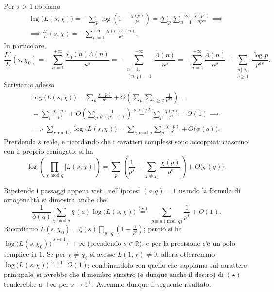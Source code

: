 \begin{oss} \label{logL}
  Per $\sigma>1$ abbiamo
  \begin{gather*}
    \log\big(L(s,\chi)\big)=-\sum_p \log\left(1-\frac{\chi(p)}{p^s}\right)=\sum_p\sum_{n=1}^{+\infty} \frac{\chi(p^n)}{np^{ns}} \implies \\
    \implies \frac{L'}{L}(s,\chi)=-\sum_{n=1}^{+\infty} \frac{\chi(n)\Lambda(n)}{n^s}.
  \end{gather*}
  In particolare,
  $$\frac{L'}{L}(s,\chi_0)=-\sum_{n=1}^{+\infty} \frac{\chi_0(n)\Lambda(n)}{n^s}=-\sum_{\substack{n=1, \\ (n,q)=1}}^{+\infty} \frac{\Lambda(n)}{n^s}=-\sum_{n=1}^{+\infty} \frac{\Lambda(n)}{n^s}+\sum_{\substack{p \mid q, \\a \ge 1}} \frac{\log{p}}{p^{as}}.$$
  Scriviamo adesso
  \begin{gather*}
    \log\big(L(s,\chi)\big)=\sum_p \frac{\chi(p)}{p^s}+O\left(\sum_p \sum_{n \ge 2} \frac{1}{p^{\sigma n}}\right)=\\
    =\sum_p \frac{\chi(p)}{p^s}+O\left(\sum_p \frac{1}{p^{\sigma}(p^{\sigma}-1)}\right)\overset{\sigma>1/2}{=}\sum_p \frac{\chi(p)}{p^s}+O(1) \implies \\
    \implies \sum_{\chi\text{ mod }q}\log\big(L(s,\chi)\big)=\sum_{\chi\text{ mod }q}\sum_p \frac{\chi(p)}{p^s}+O\big(\phi(q)\big).
  \end{gather*}
  Prendendo $s$ reale, e ricordando che i caratteri complessi sono accoppiati ciascuno con il proprio coniugato, si ha
  $$\log\left(\prod_{\chi\text{ mod }q}|L(s,\chi)|\right)=\sum_p\left(\frac{1}{p^s}+\sum_{\chi\not=\chi_0}\frac{\chi(p)}{p^s}\right)+O\big(\phi(q)\big).$$
\end{oss}

Ripetendo i passaggi appena visti, nell'ipotesi $(a,q)=1$ usando la formula di ortogonalità si dimostra anche che
$$\frac{1}{\phi(q)}\sum_{\chi\text{ mod }q} \bar{\chi}(a)\log\big(L(s,\chi)\big)\overset{(\star)}{=}\sum_{p \equiv a \pmod{q}} \frac{1}{p^s}+O(1).$$
Ricordiamo $\displaystyle L(s,\chi_0)=\zeta(s)\prod_{p \mid q} \left(1-\frac{1}{p^s}\right)$; perciò si ha $\log\big(L(s,\chi_0)\big) \overset{s \longrightarrow 1^+}{\longrightarrow} +\infty$ (prendendo $s \in \mathbb{R}$), e per la precisione c'è un polo semplice in $1$.
Se per $\chi\not=\chi_0$ si avesse $L(1,\chi)\not=0$, allora otterremmo $\log\big(L(s,\chi)\big)\overset{s \longrightarrow 1^+}{=}O(1)$; combinandolo con quello che sappiamo sul carattere principale, si avrebbe che il membro sinistro (e dunque anche il destro) di $(\star)$ tenderebbe a $+\infty$ per $s \longrightarrow 1^+$. Avremmo dunque il seguente risultato.

